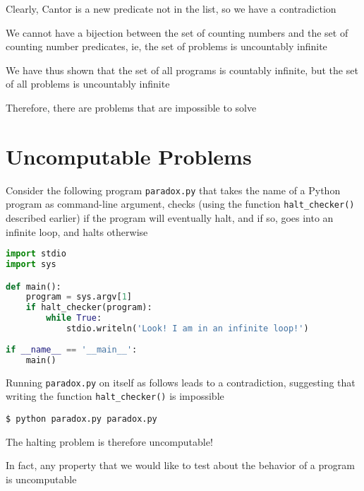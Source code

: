 \documentclass[8pt,a4paper,compress]{beamer}
\begin{document}
\begin{frame}[fragile]
\pause

Clearly, Cantor is a new predicate not in the list, so we have a contradiction

\pause
\bigskip

We cannot have a bijection between the set of counting numbers and the set of counting number predicates, ie, the set of problems is uncountably infinite

\pause
\bigskip

We have thus shown that the set of all programs is countably infinite, but the set of all problems is uncountably infinite

\pause
\bigskip

Therefore, there are problems that are impossible to solve
\end{frame}

\section{Uncomputable Problems}
\begin{frame}[fragile]
\pause

Consider the following program \lstinline{paradox.py} that takes the name of a Python program as command-line argument, checks (using the function \lstinline{halt_checker()} described earlier) if the program will eventually halt, and if so, goes into an infinite loop, and halts otherwise
\begin{lstlisting}[language=python]
import stdio
import sys

def main():
    program = sys.argv[1]
    if halt_checker(program):
        while True:
            stdio.writeln('Look! I am in an infinite loop!')
    
if __name__ == '__main__':
    main()
\end{lstlisting}

\pause
\bigskip

Running \lstinline{paradox.py} on itself as follows leads to a contradiction, suggesting that writing the function \lstinline{halt_checker()} is impossible
\begin{lstlisting}[language={}]
$ python paradox.py paradox.py
\end{lstlisting}

\pause
\bigskip

The halting problem is therefore uncomputable!

\pause
\bigskip

In fact, any property that we would like to test about the behavior of a program is uncomputable
\end{frame}
\end{document}
